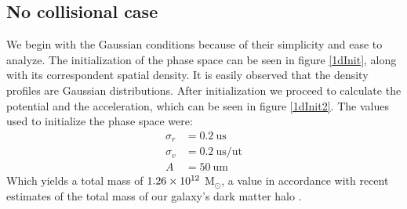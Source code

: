 \subsection{No collisional case}
We begin with the Gaussian conditions because of their simplicity and ease to analyze.
The initialization of the phase space can be seen in figure \ref{1dInit}, along with its correspondent spatial density.
It is easily observed that the density profiles are Gaussian distributions.
After initialization we proceed to calculate the potential and the acceleration, which can be seen in figure \ref{1dInit2}.
The values used to initialize the phase space were:
\begin{align}
\sigma_r &= 0.2 \ \text{us} \\
\sigma_v &= 0.2 \ \text{us} / \text{ut} \\
A &= 50  \ \text{um}
\end{align} %
Which yields a total mass of $1.26\times 10^{12}$ M$_{\odot}$, a value in accordance with recent estimates of the total mass of our galaxy's dark matter halo \cite{2013JCAP07016N}. %

